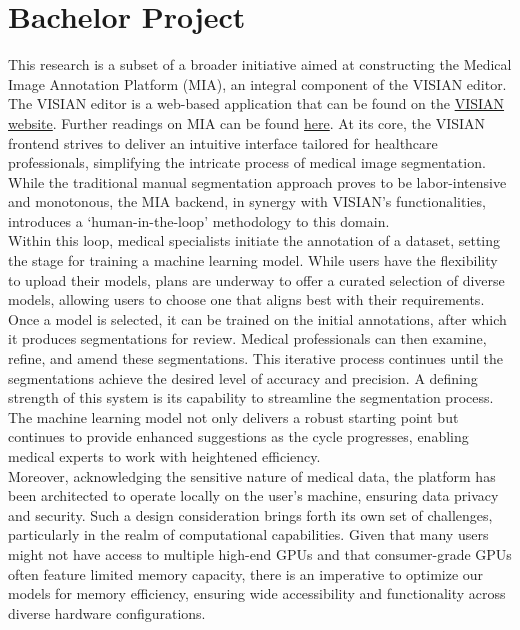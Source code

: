 \section{Bachelor Project}
This research is a subset of a broader initiative aimed at constructing the Medical Image Annotation Platform (MIA), an integral component of the VISIAN editor.
The VISIAN editor is a web-based application that can be found on the \href{https://visian.org/}{VISIAN website}. Further readings on MIA can be found \href{https://mia-ai.vercel.app/}{here}.
At its core, the VISIAN frontend strives to deliver an intuitive interface tailored for healthcare professionals, simplifying the intricate process of medical image segmentation.
While the traditional manual segmentation approach proves to be labor-intensive and monotonous, the MIA backend, in synergy with VISIAN's functionalities,
introduces a `human-in-the-loop' methodology to this domain.\\[1ex]
Within this loop, medical specialists initiate the annotation of a dataset, setting the stage for training a machine learning model. While users have the flexibility to upload their models,
plans are underway to offer a curated selection of diverse models, allowing users to choose one that aligns best with their requirements. Once a model is selected, it can be trained on the initial annotations,
after which it produces segmentations for review. Medical professionals can then examine, refine, and amend these segmentations.
This iterative process continues until the segmentations achieve the desired level of accuracy and precision. A defining strength of this system is its capability to streamline the segmentation process.
The machine learning model not only delivers a robust starting point but continues to provide enhanced suggestions as the cycle progresses, enabling medical experts to work with heightened efficiency.\\[1ex]
Moreover, acknowledging the sensitive nature of medical data, the platform has been architected to operate locally on the user's machine, ensuring data privacy and security.
Such a design consideration brings forth its own set of challenges, particularly in the realm of computational capabilities.
Given that many users might not have access to multiple high-end GPUs and that consumer-grade GPUs often feature limited memory capacity, there is an imperative to optimize our models for memory efficiency,
ensuring wide accessibility and functionality across diverse hardware configurations.


